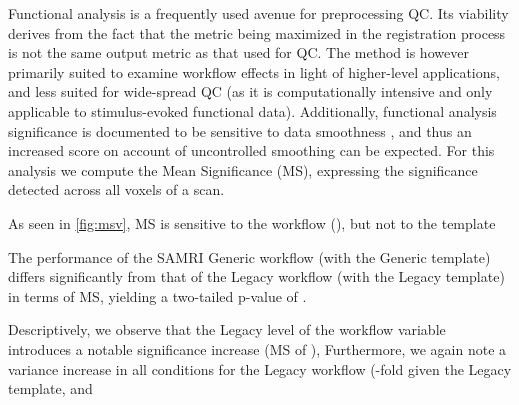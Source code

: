 Functional analysis is a frequently used avenue for preprocessing QC.
Its viability derives from the fact that the metric being maximized in the registration process is not the same output metric as that used for QC.
The method is however primarily suited to examine workflow effects in light of higher-level applications, and less suited for wide-spread QC (as it is computationally intensive and only applicable to stimulus-evoked functional data).
Additionally, functional analysis significance is documented to be sensitive to data smoothness \cite{Molloy2014}, and thus an increased score on account of uncontrolled smoothing can be expected.
For this analysis we compute the Mean Significance (MS), expressing the significance detected across all voxels of a scan.

As seen in \cref{fig:msv}, MS is sensitive to
the workflow
(),
but not to the template


The performance of the SAMRI Generic workflow (with the Generic template) differs significantly from that of the Legacy workflow (with the Legacy template) in terms of MS, yielding a two-tailed p-value of .

Descriptively, we observe that the Legacy level of the workflow variable introduces a notable significance increase
(MS of ),
Furthermore, we again note a variance increase in all conditions for the Legacy workflow
(-fold
given the Legacy template, and

